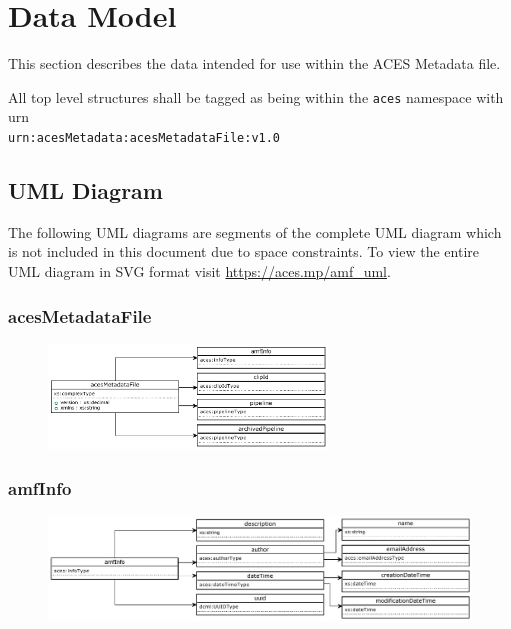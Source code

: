 \regularsectionformat	%

\newcommand{\xmlfield}[3]{
	\TabPositions{2em,1.75in,2.5in,2.6in}
	\tab\texttt{#1} \tab#2 \tab// #3	 \par
}

\chapter{Data Model}

This section describes the data intended for use within the ACES Metadata file.

All top level structures shall be tagged as being within the \texttt{aces} namespace with urn \\ \texttt{urn:acesMetadata:acesMetadataFile:v1.0}

\section{UML Diagram}
The following UML diagrams are segments of the complete UML diagram which is not included in this document due to space constraints.  To view the entire UML diagram in SVG format visit \url{https://aces.mp/amf\_uml}.

\subsection{acesMetadataFile}
\begin{figure}[H]
  \centering
  \includegraphics[width=0.66\textwidth]{./uml_diagrams/uml_amf.pdf}
\end{figure}

\subsection{amfInfo}
\begin{figure}[H]
  \centering
  \includegraphics[width=\textwidth]{./uml_diagrams/uml_amfInfo.pdf}
\end{figure}

